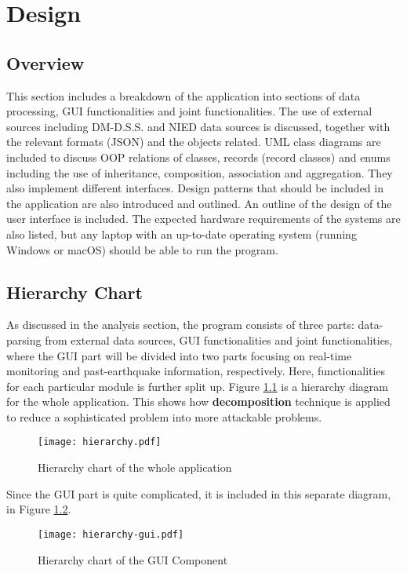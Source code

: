 \chapter{Design}
\section*{Overview}
This section includes a breakdown of the application into sections of data processing, GUI functionalities and joint functionalities. The use of external sources including DM-D.S.S. and NIED data sources is discussed, together with the relevant formats (JSON) and the objects related. UML class diagrams are included to discuss OOP relations of classes, records (record classes) and enums including the use of inheritance, composition, association and aggregation. They also implement different interfaces. Design patterns that should be included in the application are also introduced and outlined. An outline of the design of the user interface is included. The expected hardware requirements of the systems are also listed, but any laptop with an up-to-date operating system (running Windows or macOS) should be able to run the program.

\section{Hierarchy Chart}
As discussed in the analysis section, the program consists of three parts: data-parsing from external data sources, GUI functionalities and joint functionalities, where the GUI part will be divided into two parts focusing on real-time monitoring and past-earthquake information, respectively. Here, functionalities for each particular module is further split up. Figure \ref{fig:hierarchy} is a hierarchy diagram for the whole application. This shows how \textbf{decomposition} technique is applied to reduce a sophisticated problem into more attackable problems.

\begin{figure}[htp]
    \centering
    \texttt{[image: hierarchy.pdf]}
    \caption{Hierarchy chart of the whole application}
    \label{fig:hierarchy}
\end{figure}

Since the GUI part is quite complicated, it is included in this separate diagram, in Figure \ref{fig:hierarchy-gui}.

\begin{figure}[htp]
    \centering
    \texttt{[image: hierarchy-gui.pdf]}
    \caption{Hierarchy chart of the GUI Component}
    \label{fig:hierarchy-gui}
\end{figure}

